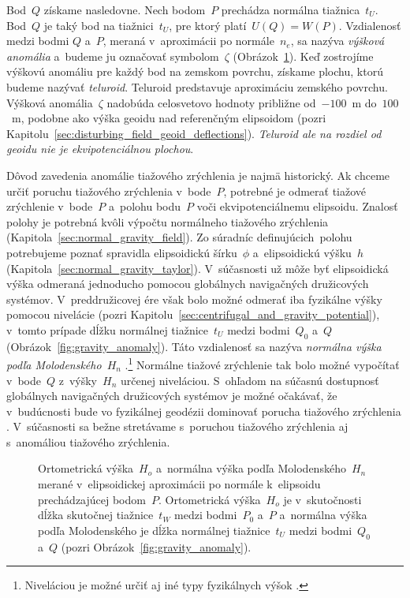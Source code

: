 \documentclass[a4paper,12pt]{book}
\begin{document}
Bod~$Q$ získame nasledovne.  Nech bodom~$P$ prechádza normálna tiažnica~$t_U$.  
Bod~$Q$ je taký bod na tiažnici~$t_U$, pre ktorý platí~$U(Q) = W(P)$.  
Vzdialenosť medzi bodmi $Q$ a~$P$, meraná v~aproximácii po normále~$n_e$, sa 
nazýva \emph{výšková anomália} a~budeme ju označovať symbolom~$\zeta$ 
(Obrázok~\ref{fig:heights}).  Keď zostrojíme výškovú anomáliu pre každý bod na 
zemskom povrchu, získame plochu, ktorú budeme nazývať \emph{teluroid}.  
Teluroid predstavuje aproximáciu zemského povrchu.  Výšková anomália~$\zeta$ 
nadobúda celosvetovo hodnoty približne od~$-100$~m do~$100$~m, podobne ako 
výška geoidu nad referenčným elipsoidom (pozri 
Kapitolu~\ref{sec:disturbing_field_geoid_deflections}).  \emph{Teluroid ale na 
rozdiel od geoidu nie je ekvipotenciálnou plochou}.

Dôvod zavedenia anomálie tiažového zrýchlenia je najmä historický.  Ak chceme 
určiť poruchu tiažového zrýchlenia v~bode~$P$, potrebné je odmerať tiažové 
zrýchlenie v~bode~$P$ a~polohu bodu~$P$ voči ekvipotenciálnemu elipsoidu.  
Znalosť polohy je potrebná kvôli výpočtu normálneho tiažového zrýchlenia 
(Kapitola~\ref{sec:normal_gravity_field}).  Zo súradníc definujúcich~polohu 
potrebujeme poznať spravidla elipsoidickú šírku~$\phi$ a~elipsoidickú výšku~$h$ 
(Kapitola~\ref{sec:normal_gravity_taylor}).  V~súčasnosti už môže byť 
elipsoidická výška odmeraná jednoducho pomocou globálnych navigačných 
družicových systémov.  V~preddružicovej ére však bolo možné odmerať iba 
fyzikálne výšky pomocou nivelácie (pozri 
Kapitolu~\ref{sec:centrifugal_and_gravity_potential}), v~tomto prípade dĺžku 
normálnej tiažnice~$t_U$ medzi bodmi~$Q_0$ a~$Q$ 
(Obrázok~\ref{fig:gravity_anomaly}).  Táto vzdialenosť sa nazýva \emph{normálna 
výška podľa Molodenského}~$H_n$ 
\parencite{MoritzPhysicalGeodesy}.\footnote{Niveláciou je možné určiť aj iné 
typy fyzikálnych výšok \parencite[pozri napríklad][]{MoritzPhysicalGeodesy}.}  
Normálne tiažové zrýchlenie tak bolo možné vypočítať v~bode~$Q$ z~výšky~$H_n$ 
určenej niveláciou.  S~ohľadom na súčasnú dostupnosť globálnych navigačných 
družicových systémov je možné očakávať, že v~budúcnosti bude vo fyzikálnej 
geodézii dominovať porucha tiažového zrýchlenia 
\parencite{MoritzPhysicalGeodesy}.  V~súčasnosti sa bežne stretávame s~poruchou 
tiažového zrýchlenia aj s~anomáliou tiažového zrýchlenia.

\begin{figure}[bt]
\centering

\caption{Ortometrická výška~$H_o$ a~normálna výška podľa Molodenského~$H_n$ 
merané v~elipsoidickej aproximácii po normále k~elipsoidu prechádzajúcej 
bodom~$P$.  Ortometrická výška~$H_o$ je v~skutočnosti dĺžka skutočnej 
tiažnice~$t_W$ medzi bodmi~$P_0$ a~$P$ a~normálna výška podľa Molodenského je 
dĺžka normálnej tiažnice~$t_U$ medzi bodmi~$Q_0$ a~$Q$ (pozri 
Obrázok~\ref{fig:gravity_anomaly}).}
\label{fig:heights}
\end{figure}
\end{document}
